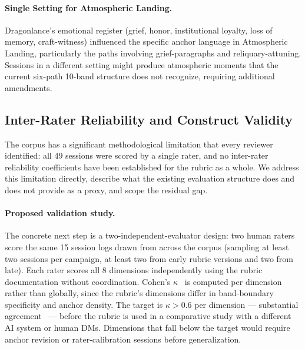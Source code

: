 \paragraph{Single Setting for Atmospheric Landing.}
Dragonlance's emotional register (grief, honor, institutional loyalty, loss of memory,
craft-witness) influenced the specific anchor language in Atmospheric Landing,
particularly the paths involving grief-paragraphs and reliquary-attuning. Sessions
in a different setting might produce atmospheric moments that the current six-path
10-band structure does not recognize, requiring additional amendments.

\subsection{Inter-Rater Reliability and Construct Validity}

The corpus has a significant methodological limitation that every reviewer identified:
all 49 sessions were scored by a single rater, and no inter-rater reliability
coefficients have been established for the rubric as a whole. We address this
limitation directly, describe what the existing evaluation structure does and does
not provide as a proxy, and scope the residual gap.

\paragraph{Proposed validation study.}
The concrete next step is a two-independent-evaluator design: two human raters score
the same 15 session logs drawn from across the corpus (sampling at least two sessions
per campaign, at least two from early rubric versions and two from late). Each rater
scores all 8 dimensions independently using the rubric documentation without
coordination. Cohen's $\kappa$~\cite{cohen1960coefficient} is computed per dimension
rather than globally, since the rubric's dimensions differ in band-boundary
specificity and anchor density. The target is $\kappa > 0.6$ per dimension ---
substantial agreement~\cite{landis1977measurement} --- before the rubric is used in a
comparative study with a different AI system or human DMs. Dimensions that fall below
the target would require anchor revision or rater-calibration sessions before
generalization.

